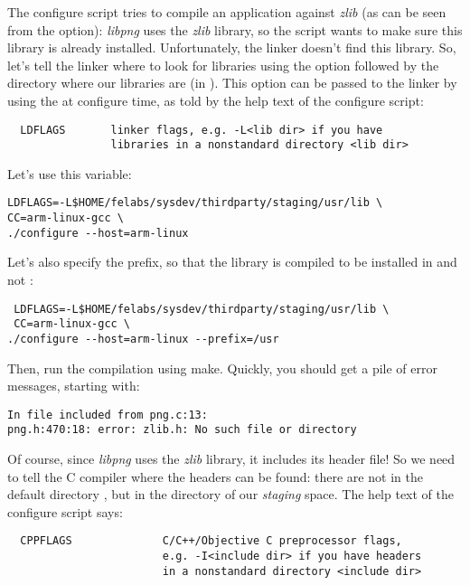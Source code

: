 The configure script tries to compile an application against {\em
  zlib} (as can be seen from the  option): {\em libpng} uses
the {\em zlib} library, so the  script wants to make
sure this library is already installed. Unfortunately, the 
linker doesn't find this library. So, let's tell the linker where to
look for libraries using the  option followed by the
directory where our libraries are (in ). This
 option can be passed to the linker by using the
 at configure time, as told by the help text of the
configure script:

\begin{verbatim}
  LDFLAGS       linker flags, e.g. -L<lib dir> if you have
                libraries in a nonstandard directory <lib dir>
\end{verbatim}

Let's use this  variable:

\begin{verbatim}
LDFLAGS=-L$HOME/felabs/sysdev/thirdparty/staging/usr/lib \
CC=arm-linux-gcc \
./configure --host=arm-linux
\end{verbatim}

Let's also specify the prefix, so that the library is compiled to be
installed in  and not :

\begin{verbatim}
 LDFLAGS=-L$HOME/felabs/sysdev/thirdparty/staging/usr/lib \
 CC=arm-linux-gcc \
./configure --host=arm-linux --prefix=/usr
\end{verbatim}

Then, run the compilation using make. Quickly, you should get a pile
of error messages, starting with:

\begin{verbatim}
In file included from png.c:13:
png.h:470:18: error: zlib.h: No such file or directory
\end{verbatim}

Of course, since {\em libpng} uses the {\em zlib} library, it includes
its header file! So we need to tell the C compiler where the headers
can be found: there are not in the default directory
, but in the  directory of our
{\em staging} space. The help text of the configure script says:

\begin{verbatim}
  CPPFLAGS              C/C++/Objective C preprocessor flags,
                        e.g. -I<include dir> if you have headers
                        in a nonstandard directory <include dir>
\end{verbatim}

